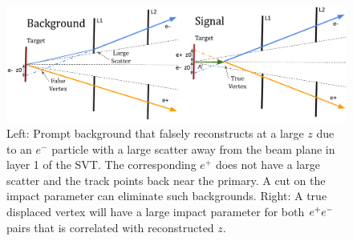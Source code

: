 \begin{figure}[t]
    \centering
    \includegraphics[width=.95\textwidth]{figs/selection/Z0_schem.png}
    \caption{Left: Prompt background that falsely reconstructs at a large $z$ due to an $e^-$ particle with a large scatter away from the beam plane in layer 1 of the SVT. The corresponding $e^+$ does not have a large scatter and the track points back near the primary. A cut on the impact parameter can eliminate such backgrounds. Right: A true displaced vertex will have a large impact parameter for both $e^{+}e^{-}$ pairs that is correlated with reconstructed $z$.}
    \label{fig:z0_schem}
\end{figure}



